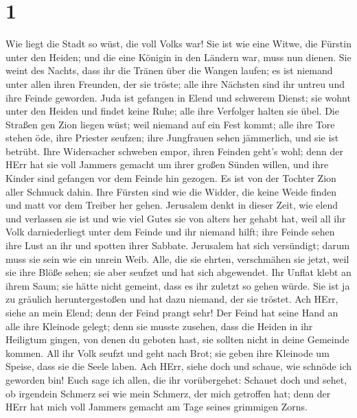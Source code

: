 \hypertarget{section}{%
\section{1}\label{section}}

 Wie liegt die Stadt so wüst, die voll Volks war! Sie ist
wie eine Witwe, die Fürstin unter den Heiden; und die eine Königin in
den Ländern war, muss nun dienen.  Sie weint des Nachts,
dass ihr die Tränen über die Wangen laufen; es ist niemand unter allen
ihren Freunden, der sie tröste; alle ihre Nächsten sind ihr untreu und
ihre Feinde geworden.  Juda ist gefangen in Elend und
schwerem Dienst; sie wohnt unter den Heiden und findet keine Ruhe; alle
ihre Verfolger halten sie übel.  Die Straßen gen Zion liegen
wüst; weil niemand auf ein Fest kommt; alle ihre Tore stehen öde, ihre
Priester seufzen; ihre Jungfrauen sehen jämmerlich, und sie ist betrübt.
 Ihre Widersacher schweben empor, ihren Feinden geht's wohl;
denn der HErr hat sie voll Jammers gemacht um ihrer großen Sünden
willen, und ihre Kinder sind gefangen vor dem Feinde hin gezogen.
 Es ist von der Tochter Zion aller Schmuck dahin. Ihre
Fürsten sind wie die Widder, die keine Weide finden und matt vor dem
Treiber her gehen.  Jerusalem denkt in dieser Zeit, wie
elend und verlassen sie ist und wie viel Gutes sie von alters her gehabt
hat, weil all ihr Volk darniederliegt unter dem Feinde und ihr niemand
hilft; ihre Feinde sehen ihre Lust an ihr und spotten ihrer Sabbate.
 Jerusalem hat sich versündigt; darum muss sie sein wie ein
unrein Weib. Alle, die sie ehrten, verschmähen sie jetzt, weil sie ihre
Blöße sehen; sie aber seufzet und hat sich abgewendet.  Ihr
Unflat klebt an ihrem Saum; sie hätte nicht gemeint, dass es ihr zuletzt
so gehen würde. Sie ist ja zu gräulich heruntergestoßen und hat dazu
niemand, der sie tröstet. Ach HErr, siehe an mein Elend; denn der Feind
prangt sehr!  Der Feind hat seine Hand an alle ihre
Kleinode gelegt; denn sie musste zusehen, dass die Heiden in ihr
Heiligtum gingen, von denen du geboten hast, sie sollten nicht in deine
Gemeinde kommen.  All ihr Volk seufzt und geht nach Brot;
sie geben ihre Kleinode um Speise, dass sie die Seele laben. Ach HErr,
siehe doch und schaue, wie schnöde ich geworden bin!  Euch
sage ich allen, die ihr vorübergehet: Schauet doch und sehet, ob
irgendein Schmerz sei wie mein Schmerz, der mich getroffen hat; denn der
HErr hat mich voll Jammers gemacht am Tage seines grimmigen Zorns.
